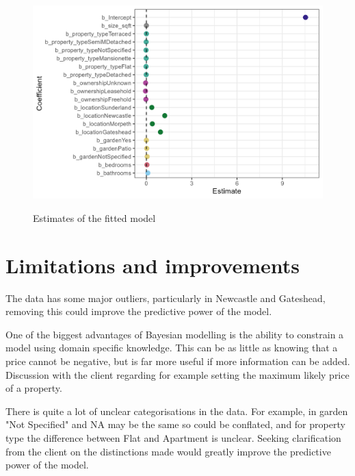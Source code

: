 \documentclass{scrartcl}
\begin{document}
\begin{figure}
	\includegraphics[width = \textwidth]{../figures/estimates.png}
	\label{fig:estimates}
	\caption{Estimates of the fitted model}
\end{figure}



\section{Limitations and improvements} \label{limitations}
The data has some major outliers, particularly in Newcastle and Gateshead, removing this could improve the predictive power of the model.

One of the biggest advantages of Bayesian modelling is the ability to constrain a model using domain specific knowledge. This can be as little as knowing that a price cannot be negative, but is far more useful if more information can be added. Discussion with the client regarding for example setting the maximum likely price of a property.

There is quite a lot of unclear categorisations in the data. For example, in garden "Not Specified" and NA may be the same so could be conflated, and for property type the difference between Flat and Apartment is unclear. Seeking clarification from the client on the distinctions made would greatly improve the predictive power of the model. 
\end{document}
